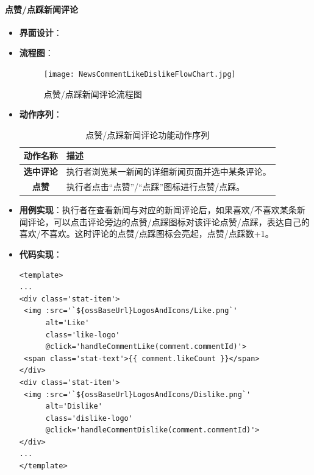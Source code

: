 \paragraph{点赞/点踩新闻评论}
\begin{itemize}
	\item \textbf{界面设计}：
	\item \textbf{流程图}：
	\begin{figure}[H]
		\centering
		\texttt{[image: NewsCommentLikeDislikeFlowChart.jpg]}
		\caption{点赞/点踩新闻评论流程图}
		\label{NewsCommentLikeDislikeFlowChart}
	\end{figure}
	\item \textbf{动作序列}：
	\begin{table}[H]
		\centering
		\caption{点赞/点踩新闻评论功能动作序列}
		\renewcommand\arraystretch{1.5}
		\begin{tabular}{|c|>{\raggedright\arraybackslash}p{10cm}|}
			\hline
			\textbf{动作名称} & \textbf{描述} \\ \hline
			\textbf{选中评论} & 执行者浏览某一新闻的详细新闻页面并选中某条评论。 \\ \hline
			\textbf{点赞} & 执行者点击“点赞”/“点踩”图标进行点赞/点踩。 \\ \hline
		\end{tabular}
	\end{table}
	\item \textbf{用例实现}：执行者在查看新闻与对应的新闻评论后，如果喜欢/不喜欢某条新闻评论，可以点击评论旁边的点赞/点踩图标对该评论点赞/点踩，表达自己的喜欢/不喜欢。这时评论的点赞/点踩图标会亮起，点赞/点踩数+1。
	\item \textbf{代码实现}：
	\begin{verbatim}
<template>
...
<div class='stat-item'>
 <img :src='`${ossBaseUrl}LogosAndIcons/Like.png`'
      alt='Like'
      class='like-logo'
      @click='handleCommentLike(comment.commentId)'>
 <span class='stat-text'>{{ comment.likeCount }}</span>
</div>
<div class='stat-item'>
 <img :src='`${ossBaseUrl}LogosAndIcons/Dislike.png`'
      alt='Dislike'
      class='dislike-logo'
      @click='handleCommentDislike(comment.commentId)'>
</div>
...
</template>
	\end{verbatim}
	

\end{itemize}
